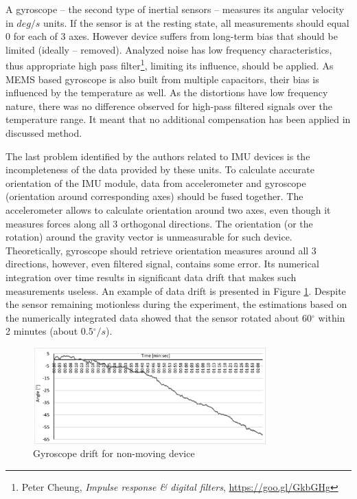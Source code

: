 \documentclass[sensors,article,submit,moreauthors,pdftex,10pt,a4paper]{mdpi}
\newcommand{\degree}{\ensuremath{{}^{\circ}}\xspace}
\begin{document}
A gyroscope – the second type of inertial sensors – measures its angular velocity in $deg/s$  units. If the sensor is at the resting state, all measurements should equal 0 for each of 3 axes. However device suffers from long-term bias that should be limited (ideally – removed). Analyzed noise has low frequency characteristics, thus appropriate high pass filter\footnote{Peter Cheung, \textit{Impulse response \& digital filters}, \url{https://goo.gl/GkbGHg}}, limiting its influence, should be applied. As MEMS based gyroscope is also built from multiple capacitors, their bias is influenced by the temperature as well. As the distortions have low frequency nature, there was no difference observed for high-pass filtered signals over the temperature range. It meant that no additional compensation has been applied in discussed method. 

The last problem identified by the authors related to IMU devices is the incompleteness of the data provided by these units. To calculate accurate orientation of the IMU module, data from accelerometer and gyroscope (orientation around corresponding axes) should be fused together. The accelerometer allows to calculate orientation around two axes, even though it measures forces along all 3 orthogonal directions. The orientation (or the rotation) around the gravity vector is unmeasurable for such device. Theoretically, gyroscope should retrieve orientation measures around all 3 directions, however, even filtered signal, contains some error. Its numerical integration over time results in significant data drift that makes such measurements useless. An example of data drift is presented in Figure \ref{fig:imu:drift}. Despite the sensor remaining motionless during the experiment, the estimations based on the numerically integrated data showed that the sensor rotated about $60\degree$ within 2 minutes (about $0.5\degree/s$).
\begin{figure}[H]
	\centering
	\includegraphics[width=0.8\textwidth]{Figure7.png}
	\caption{Gyroscope drift for non-moving device}
	\label{fig:imu:drift}
\end{figure}
\end{document}
